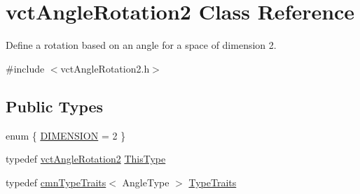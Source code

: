 \hypertarget{classvct_angle_rotation2}{}\section{vct\+Angle\+Rotation2 Class Reference}
\label{classvct_angle_rotation2}


Define a rotation based on an angle for a space of dimension 2.  




{\ttfamily \#include $<$vct\+Angle\+Rotation2.\+h$>$}

\subsection*{Public Types}
\begin{DoxyCompactItemize}
\item 
enum \{ \hyperlink{group__cisst_vector_ggafbea62c89658b43900b288ac6f3981e6a511d05c6ad1614fcd0459444b62b4364}{D\+I\+M\+E\+N\+S\+I\+O\+N} = 2
 \}
\item 
typedef \hyperlink{classvct_angle_rotation2}{vct\+Angle\+Rotation2} \hyperlink{classvct_angle_rotation2_a67339254f084f89c13aca70c1242d18e}{This\+Type}
\item 
typedef \hyperlink{classcmn_type_traits}{cmn\+Type\+Traits}$<$ Angle\+Type $>$ \hyperlink{classvct_angle_rotation2_a218a0396bd24a4b2ece9e886a84a567c}{Type\+Traits}
\end{DoxyCompactItemize}
